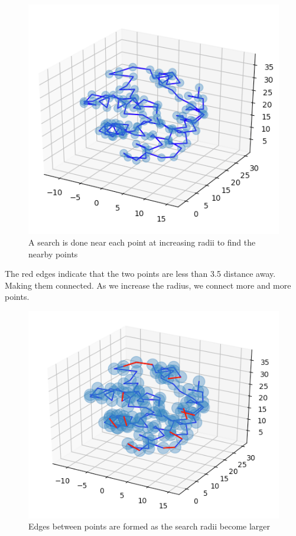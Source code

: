\documentclass[12pt, a4paper, twocolumn, fullpage]{article}
\theoremstyle{plain}
\theoremstyle{definition}
\theoremstyle{remark}
\begin{document}
\begin{figure}
    \includegraphics[width=\linewidth]{img/hom/ballRad1.png}
    \caption{A search is done near each point at increasing radii to find the nearby points }
    \label{ballRad1}
\end{figure}
The red edges indicate that the two points are less than 3.5 distance away. Making them connected.
As we increase the radius, we connect more and more points.
\begin{figure}
    \includegraphics[width=\linewidth]{img/hom/ballRad2.png}
    \caption{Edges between points are formed as the search radii become larger}
    \label{ballRad2}
\end{figure}
\end{document}
